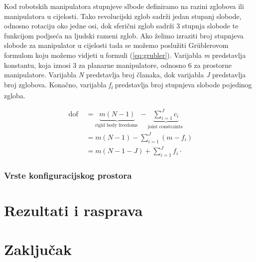 \documentclass[times, utf8, diplomskirad]{fer}
\begin{document}
Kod robotskih manipulatora stupnjeve slbode definiramo na razini zglobova ili manipulatora u cijelosti.
Tako revolucijski zglob sadrži jedan stupanj slobode, odnosno rotaciju oko jedne osi, dok sferični zglob sadrži 3 stupnja slobode te funkcijom podjseća na ljudski rameni zglob.
Ako želimo izraziti broj stupnjeva slobode za manipulator u cijelosti tada se možemo poslužiti Grüblerovom formulom koju možemo vidjeti u formuli (\ref{eq:grubler}).
Varijabla \textit{m} predstavlja konstantu, koja iznosi 3 za planarne manipulatore, odnosno 6 za prostorne manipulatore.
Varijabla \textit{N} predstavlja broj članaka, dok varijabla \textit{J} predstavlja broj zglobova.
Konačno, varijabla \textit{f\textsubscript{i}} predstavlja broj stupnjeva slobode pojedinog zgloba.

\begin{equation}
    \begin{aligned}
        \text { dof } &=\underbrace{m(N-1)}_{\text {rigid body freedoms }}-\underbrace{\sum_{i=1}^{J} c_{i}}_{\text {joint constraints }} \\
        &=m(N-1)-\sum_{i=1}^{J}\left(m-f_{i}\right) \\
        &=m(N-1-J)+\sum_{i=1}^{J} f_{i} \cdot
    \end{aligned}
    \label{eq:grubler}
\end{equation}

\subsection{Vrste konfiguracijskog prostora}

\chapter{Rezultati i rasprava}
\label{pog:rezultati_i_rasprava}



\chapter{Zaključak}
\label{pog:zakljucak}





\end{document}
